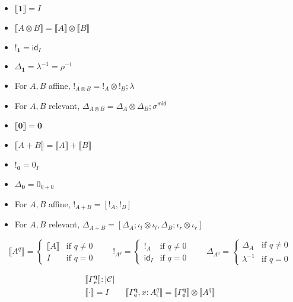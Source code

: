\documentclass[acmsmall,screen,review]{acmart}
\newcommand{\mc}[1]{\ensuremath{\mathcal{#1}}}
\newcommand{\mb}[1]{\ensuremath{\mathbf{#1}}}
\newcommand{\ms}[1]{\ensuremath{\mathsf{#1}}}
\newcommand{\dnt}[1]{\llbracket{#1}\rrbracket}
\newcommand{\dmor}[1]{{\Delta}_{#1}}
\newcommand{\subiterssa}{\(\lambda_{\ms{iter}}\)}
\begin{document}
\begin{definition}[\subiterssa-model]
\begin{itemize}
    \item $\dnt{\mb{1}} = I$
    \item $\dnt{A \otimes B} = \dnt{A} \otimes \dnt{B}$
    \item $!_{\mb{1}} = \ms{id}_I$
    \item $\Delta_{\mb{1}} = \lambda^{-1} = \rho^{-1}$
    \item For $A, B$ affine, $!_{A \otimes B} = !_A \otimes !_B ; \lambda$
    \item For $A, B$ relevant, 
    $\Delta_{A \otimes B} 
      = \dmor{A} \otimes \dmor{B}
      ; \sigma^{\ms{mid}}
    $
    \item $\dnt{\mb{0}} = \mb{0}$
    \item $\dnt{A + B} = \dnt{A} + \dnt{B}$
    \item $!_{\mb{0}} = 0_{I}$
    \item $\Delta_{\mb{0}} = 0_{0 + 0}$
    \item For $A, B$ affine, $!_{A + B} = [!_A, !_B]$
    \item For $A, B$ relevant, 
    $\Delta_{A + B} 
      = [\dmor{A} ; \iota_l \otimes \iota_l, \dmor{B} ; \iota_r \otimes \iota_r]
    $
  \end{itemize}
\end{definition}

\begin{equation*}
  \dnt{A^q} = \begin{cases}
    \dnt{A} & \text{if } q \neq 0 \\
    I       & \text{if } q = 0
  \end{cases} \qquad
  !_{A^q} = \begin{cases}
    !_A & \text{if } q \neq 0 \\
    \ms{id}_I & \text{if } q = 0
  \end{cases} \qquad
  \Delta_{A^q} = \begin{cases}
    \dmor{A} & \text{if } q \neq 0 \\
    \lambda^{-1} & \text{if } q = 0
  \end{cases}
\end{equation*}

\begin{gather*}
  \boxed{\dnt{\Gamma^{\mb{q}}_{\mb{e}}} : |\mc{C}|} \\
  \dnt{\cdot} = I
  \qquad \dnt{\Gamma^{\mb{q}}_{\mb{e}}, x : A^q_\epsilon} 
          = \dnt{\Gamma^{\mb{q}}_{\mb{e}}} \otimes \dnt{A^q}
\end{gather*}
\end{document}
